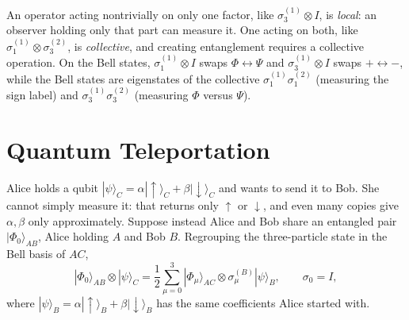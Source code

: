 An operator acting nontrivially on only one factor, like $\sigma_3^{(1)}\otimes I$, is \emph{local}: an observer holding only that part can measure it. One acting on both, like $\sigma_1^{(1)}\otimes\sigma_3^{(2)}$, is \emph{collective}, and creating entanglement requires a collective operation. On the Bell states, $\sigma_1^{(1)}\otimes I$ swaps $\Phi\leftrightarrow\Psi$ and $\sigma_3^{(1)}\otimes I$ swaps $+\leftrightarrow-$, while the Bell states are eigenstates of the collective $\sigma_1^{(1)}\sigma_1^{(2)}$ (measuring the sign label) and $\sigma_3^{(1)}\sigma_3^{(2)}$ (measuring $\Phi$ versus $\Psi$).

\section{Quantum Teleportation}

Alice holds a qubit $|\psi\rangle_C = \alpha|{\uparrow}\rangle_C + \beta|{\downarrow}\rangle_C$ and wants to send it to Bob. She cannot simply measure it: that returns only $\uparrow$ or $\downarrow$, and even many copies give $\alpha,\beta$ only approximately. Suppose instead Alice and Bob share an entangled pair $|\Phi_0\rangle_{AB}$, Alice holding $A$ and Bob $B$. Regrouping the three-particle state in the Bell basis of $AC$,
\[
    |\Phi_0\rangle_{AB}\otimes|\psi\rangle_C = \frac12\sum_{\mu=0}^3|\Phi_\mu\rangle_{AC}\otimes\sigma_\mu^{(B)}|\psi\rangle_B,
    \qquad
    \sigma_0 = I,
\]
where $|\psi\rangle_B = \alpha|{\uparrow}\rangle_B + \beta|{\downarrow}\rangle_B$ has the same coefficients Alice started with.

